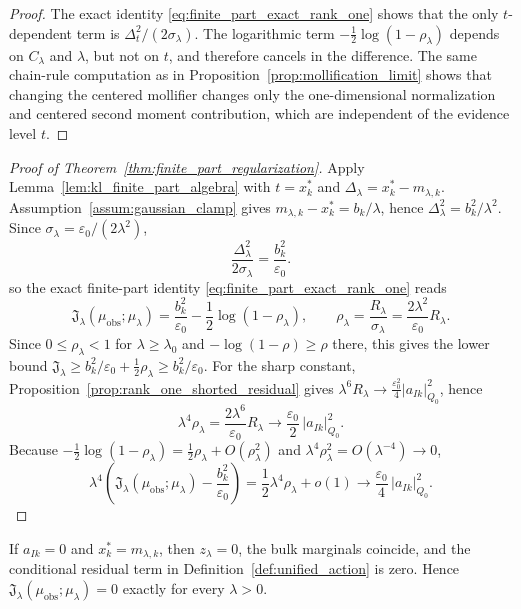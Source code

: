 \begin{proof}
The exact identity \eqref{eq:finite_part_exact_rank_one} shows that the only
$t$-dependent term is $\Delta_t^2/(2\sigma_\lambda)$.  The logarithmic term
$-\frac12\log(1-\rho_\lambda)$ depends on $C_\lambda$ and $\lambda$, but not on
$t$, and therefore cancels in the difference.  The same chain-rule computation
as in Proposition~\ref{prop:mollification_limit} shows that changing the centered
mollifier changes only the one-dimensional normalization and centered second
moment contribution, which are independent of the evidence level $t$.
\end{proof}

\begin{proof}[Proof of Theorem~\ref{thm:finite_part_regularization}]
Apply Lemma~\ref{lem:kl_finite_part_algebra} with $t=x_k^*$ and
$\Delta_\lambda=x_k^*-m_{\lambda,k}$.  Assumption~\ref{assum:gaussian_clamp}
gives $m_{\lambda,k}-x_k^*=b_k/\lambda$, hence
$\Delta_\lambda^2=b_k^2/\lambda^2$.  Since
$\sigma_\lambda=\varepsilon_0/(2\lambda^2)$,
\[
  \frac{\Delta_\lambda^2}{2\sigma_\lambda}
  =\frac{b_k^2}{\varepsilon_0}.
\]
so the exact finite-part identity \eqref{eq:finite_part_exact_rank_one} reads
\[
  \mathfrak{J}_\lambda(\mu_{\mathrm{obs}};\mu_\lambda)
  =\frac{b_k^2}{\varepsilon_0}-\frac12\log(1-\rho_\lambda),
  \qquad
  \rho_\lambda=\frac{R_\lambda}{\sigma_\lambda}=\frac{2\lambda^2}{\varepsilon_0}R_\lambda .
\]
Since $0\le\rho_\lambda<1$ for $\lambda\ge\lambda_0$ and
$-\log(1-\rho)\ge\rho$ there, this gives the lower bound
$\mathfrak{J}_\lambda\ge b_k^2/\varepsilon_0+\tfrac12\rho_\lambda\ge b_k^2/\varepsilon_0$.
For the sharp constant, Proposition~\ref{prop:rank_one_shorted_residual} gives
$\lambda^6R_\lambda\to\tfrac{\varepsilon_0^2}{4}|a_{Ik}|_{Q_0}^2$, hence
\[
  \lambda^4\rho_\lambda
  =\frac{2\lambda^6}{\varepsilon_0}R_\lambda
  \longrightarrow\frac{\varepsilon_0}{2}\,|a_{Ik}|_{Q_0}^2 .
\]
Because $-\tfrac12\log(1-\rho_\lambda)=\tfrac12\rho_\lambda+O(\rho_\lambda^2)$ and
$\lambda^4\rho_\lambda^2=O(\lambda^{-4})\to0$,
\[
  \lambda^4\!\left(
    \mathfrak{J}_\lambda(\mu_{\mathrm{obs}};\mu_\lambda)
    -\frac{b_k^2}{\varepsilon_0}
  \right)
  =\frac12\lambda^4\rho_\lambda+o(1)
  \longrightarrow\frac{\varepsilon_0}{4}\,|a_{Ik}|_{Q_0}^2 .
\]
\end{proof}

If $a_{Ik}=0$ and $x_k^*=m_{\lambda,k}$, then
$z_\lambda=0$, the bulk marginals coincide, and the conditional residual term
in Definition~\ref{def:unified_action} is zero.  Hence
$\mathfrak{J}_\lambda(\mu_{\mathrm{obs}};\mu_\lambda)=0$ exactly for every
$\lambda>0$.

